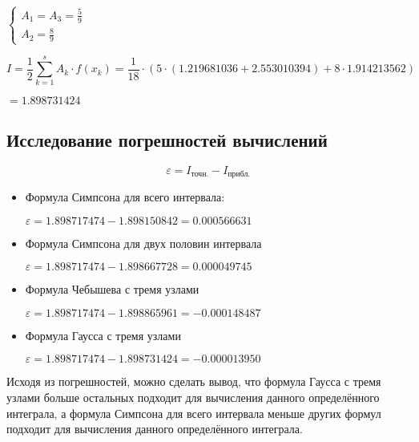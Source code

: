 $
 \begin{cases}
   A_1 = A_3 = \frac{5}{9}
   \\
   A_2 = \frac{8}{9}
 \end{cases}
$

\begin{displaymath}
I = \frac{1}{2} \sum_{k=1}^{s} A_k \cdot f(x_k) = \frac{1}{18} \cdot (5 \cdot (1.219681036 + 2.553010394) + 8 \cdot 1.914213562)
\end{displaymath}

$ = 1.898731424$

\subsection{Исследование погрешностей вычислений}

\begin{displaymath}
\varepsilon = I_\text{точн.} - I_\text{прибл.}
\end{displaymath}

\begin{itemize}

\item Формула Симпсона для всего интервала:

$\varepsilon = 1.898717474 - 1.898150842 = 0.000566631$

\item Формула Симпсона для двух половин интервала

$\varepsilon = 1.898717474 - 1.898667728 = 0.000049745$

\item Формула Чебышева с тремя узлами

$\varepsilon = 1.898717474 - 1.898865961 = -0.000148487$

\item Формула Гаусса с тремя узлами

$\varepsilon = 1.898717474 - 1.898731424 = -0.000013950$

\end{itemize}

Исходя из погрешностей, можно сделать вывод, что формула Гаусса с тремя узлами больше остальных подходит для вычисления данного определённого интеграла, а формула Симпсона для всего интервала меньше других формул подходит для вычисления данного определённого интеграла. 


